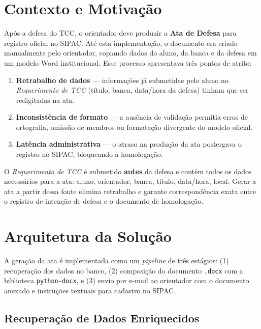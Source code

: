 \documentclass[12pt,a4paper]{report}
\begin{document}
\section{Contexto e Motivação}

Após a defesa do TCC, o orientador deve produzir a \textbf{Ata de Defesa} para
registro oficial no SIPAC. Até esta implementação, o documento era criado
manualmente pelo orientador, copiando dados do aluno, da banca e da defesa em
um modelo Word institucional. Esse processo apresentava três pontos de atrito:

\begin{enumerate}
  \item \textbf{Retrabalho de dados} — informações já submetidas pelo aluno no
        \emph{Requerimento de TCC} (título, banca, data/hora da defesa) tinham
        que ser redigitadas na ata.
  \item \textbf{Inconsistência de formato} — a ausência de validação permitia
        erros de ortografia, omissão de membros ou formatação divergente do
        modelo oficial.
  \item \textbf{Latência administrativa} — o atraso na produção da ata
        postergava o registro no SIPAC, bloqueando a homologação.
\end{enumerate}

\begin{insight}[title=Geração a partir da fonte de verdade]
O \emph{Requerimento de TCC} é submetido \textbf{antes} da defesa e contém
todos os dados necessários para a ata: aluno, orientador, banca, título,
data/hora, local. Gerar a ata a partir dessa fonte elimina retrabalho e garante
correspondência exata entre o registro de intenção de defesa e o documento de
homologação.
\end{insight}

\section{Arquitetura da Solução}

A geração da ata é implementada como um \textit{pipeline} de três estágios:
(1) recuperação dos dados no banco, (2) composição do documento
\texttt{.docx} com a biblioteca \texttt{python-docx}, e (3) envio por e-mail ao
orientador com o documento anexado e instruções textuais para cadastro no SIPAC.

\subsection{Recuperação de Dados Enriquecidos}
\end{document}
